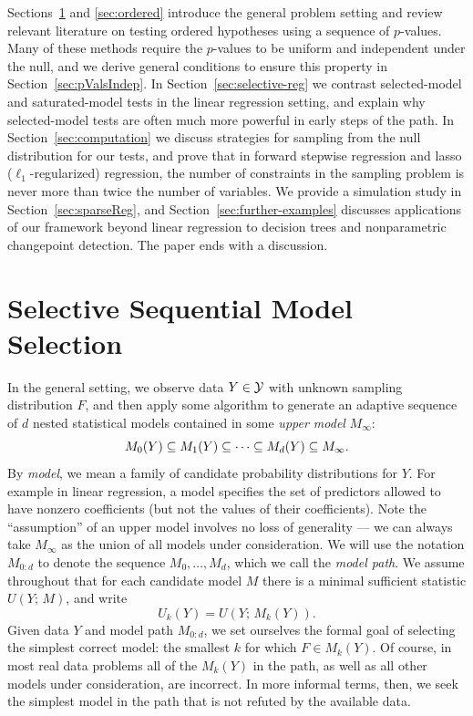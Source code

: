 \documentclass{article}
\begin{document}
Sections~\ref{sec:genericSetting} and \ref{sec:ordered} introduce the general problem setting and review relevant literature on testing ordered hypotheses using a sequence of $p$-values. Many of these methods require the $p$-values to be uniform and independent under the null, and we derive general conditions to ensure this property in Section~\ref{sec:pValsIndep}. In Section~\ref{sec:selective-reg} we contrast selected-model and saturated-model tests in the linear regression setting, and explain why selected-model tests are often much more powerful in early steps of the path. In Section~\ref{sec:computation} we discuss strategies for sampling from the null distribution for our tests, and prove that in forward stepwise regression and lasso ($\ell_1$-regularized) regression, the number of constraints in the sampling problem is never more than twice the number of variables. We provide a simulation study in Section~\ref{sec:sparseReg}, and Section~\ref{sec:further-examples} discusses applications of our framework beyond linear regression to decision trees and nonparametric changepoint detection. The paper ends with a discussion.

\section{Selective Sequential Model Selection}
\label{sec:genericSetting}

In the general setting, we observe data $Y \in \mathcal{Y}$ with unknown sampling distribution $F$, and then apply some algorithm to generate an adaptive sequence of $d$ nested statistical models contained in some {\em upper model} $M_{\infty}$:
\[
M_0(Y) \subseteq M_1(Y) \subseteq \cdots \subseteq M_d(Y) \subseteq M_\infty.
\]
By {\em model}, we mean a family of candidate probability distributions for $Y$. For example in  linear regression, a model specifies  the set of
predictors allowed to have nonzero coefficients (but not the  values of their coefficients). Note the ``assumption'' of an upper model involves no loss of generality --- we can always take $M_\infty$ as the union of all models under consideration. We will use the notation $M_{0:d}$ to denote the sequence $M_0, \ldots, M_d$, which we call the {\em model path}. We assume throughout that for each candidate model $M$ there is a minimal sufficient statistic $U(Y; \,M)$, and write
\[
U_k(Y) = U(Y; \,M_k(Y)).
\]
Given data $Y$ and model path $M_{0:d}$, we set ourselves the formal goal of selecting the simplest correct model: the smallest $k$ for which $F\in M_k(Y)$. Of course, in most real data problems all of the $M_k(Y)$ in the path, as well as all other models under consideration, are incorrect. In more informal terms, then, we seek the simplest model in the path that is not refuted by the available data.
\end{document}
